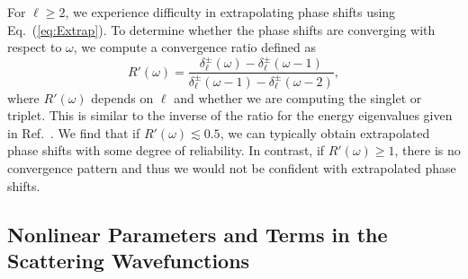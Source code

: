 \documentclass[preprint,showpacs,showkeys,preprintnumbers,amsmath,amssymb,longbibliography,pra,aps]{revtex4-1}
\begin{document}
{For $\ell \geq 2$, we experience difficulty in extrapolating phase shifts
using Eq.~(\ref{eq:Extrap}). To determine whether the phase shifts are
converging with respect to $\omega$, we compute a convergence ratio defined as
\begin{equation}
\label{eq:ConvRatio}
R'(\omega) = \frac{\delta_\ell^\pm(\omega)-\delta_\ell^\pm(\omega-1)}
  {\delta_\ell^\pm(\omega-1)-\delta_\ell^\pm(\omega-2)},
\end{equation}
where $R'(\omega)$ depends on $\ell$ and whether we are computing the
singlet or triplet.
This is similar to the inverse of the ratio for the energy eigenvalues given in
Ref.~\cite{Yan1999}. We find that if $R'(\omega) \lesssim 0.5$, we can
typically
obtain extrapolated phase shifts with some degree of reliability. In contrast,
if $R'(\omega) \geq 1$, there is no convergence pattern and thus we would not
be confident with extrapolated phase shifts.


\subsection{Nonlinear Parameters and Terms in the Scattering Wavefunctions}
\label{sec:Parameters}


}
\end{document}

